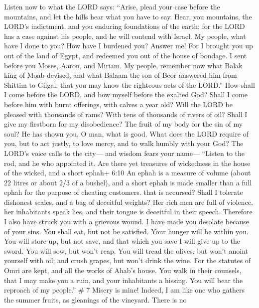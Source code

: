  Listen now to what the LORD says: ``Arise, plead your case
before the mountains, and let the hills hear what you have to say.
 Hear, you mountains, the LORD's indictment, and you
enduring foundations of the earth; for the LORD has a case against his
people, and he will contend with Israel.  My people, what
have I done to you? How have I burdened you? Answer me!  For
I brought you up out of the land of Egypt, and redeemed you out of the
house of bondage. I sent before you Moses, Aaron, and Miriam.
 My people, remember now what Balak king of Moab devised,
and what Balaam the son of Beor answered him from Shittim to Gilgal,
that you may know the righteous acts of the LORD.''  How
shall I come before the LORD, and bow myself before the exalted God?
Shall I come before him with burnt offerings, with calves a year old?
 Will the LORD be pleased with thousands of rams? With tens
of thousands of rivers of oil? Shall I give my firstborn for my
disobedience? The fruit of my body for the sin of my soul? 
He has shown you, O man, what is good. What does the LORD require of
you, but to act justly, to love mercy, and to walk humbly with your God?
 The LORD's voice calls to the city--- and wisdom fears your
name--- ``Listen to the rod, and he who appointed it.  Are
there yet treasures of wickedness in the house of the wicked, and a
short ephah+ 6:10 An ephah is a measure of volume (about 22 litres or
about 2/3 of a bushel), and a short ephah is made smaller than a full
ephah for the purpose of cheating customers. that is accursed?
 Shall I tolerate dishonest scales, and a bag of deceitful
weights?  Her rich men are full of violence, her
inhabitants speak lies, and their tongue is deceitful in their speech.
 Therefore I also have struck you with a grievous wound. I
have made you desolate because of your sins.  You shall
eat, but not be satisfied. Your hunger will be within you. You will
store up, but not save, and that which you save I will give up to the
sword.  You will sow, but won't reap. You will tread the
olives, but won't anoint yourself with oil; and crush grapes, but won't
drink the wine.  For the statutes of Omri are kept, and all
the works of Ahab's house. You walk in their counsels, that I may make
you a ruin, and your inhabitants a hissing. You will bear the reproach
of my people.'' \# 7  Misery is mine! Indeed, I am like one
who gathers the summer fruits, as gleanings of the vineyard. There is no
